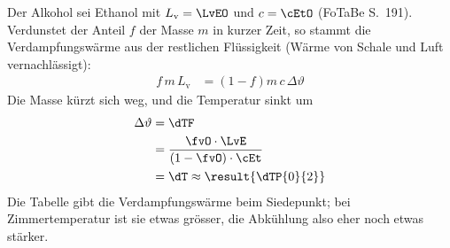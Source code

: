 Der Alkohol sei Ethanol mit $L_\text{v} = \LvEO$ und $c = \cEtO$ (FoTaBe S.~191). Verdunstet der Anteil $f$ der Masse $m$ in kurzer Zeit, so stammt die Verdampfungswärme aus der restlichen Flüssigkeit (Wärme von Schale und Luft vernachlässigt):
\begin{align}
 f\,m\,L_\text{v} &= \left(1-f\right)m\,c\,\Delta\vartheta
\end{align}
Die Masse kürzt sich weg, und die Temperatur sinkt um
\begin{align}
 \Delta\vartheta &= \dTF \\
   &= \frac{\fvO\cdot\LvE}{\left(1-\fvO\right)\cdot\cEt} \\
   &= \dT \approx \result{\dTP{0}{2}}
\end{align}
Die Tabelle gibt die Verdampfungswärme beim Siedepunkt; bei Zimmertemperatur ist sie etwas grösser, die Abkühlung also eher noch etwas stärker.
